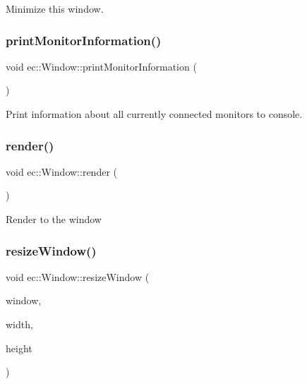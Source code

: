 Minimize this window. \mbox{\label{classec_1_1_window_aed6043c22655278bcb7d196b2a4ded82}} 
\subsubsection{\texorpdfstring{print\+Monitor\+Information()}{printMonitorInformation()}}
{\footnotesize\ttfamily void ec\+::\+Window\+::print\+Monitor\+Information (\begin{DoxyParamCaption}{ }\end{DoxyParamCaption})\hspace{0.3cm}{\ttfamily [static]}}

Print information about all currently connected monitors to console. \mbox{\label{classec_1_1_window_acb066b817adc7c790b0810695078dee3}} 
\subsubsection{\texorpdfstring{render()}{render()}}
{\footnotesize\ttfamily void ec\+::\+Window\+::render (\begin{DoxyParamCaption}{ }\end{DoxyParamCaption})\hspace{0.3cm}{\ttfamily [virtual]}}

Render to the window \mbox{\label{classec_1_1_window_a33ef071f4198715ae42844c681fb40eb}} 
\subsubsection{\texorpdfstring{resize\+Window()}{resizeWindow()}}
{\footnotesize\ttfamily void ec\+::\+Window\+::resize\+Window (\begin{DoxyParamCaption}\item[{G\+L\+F\+Wwindow $\ast$}]{window,  }\item[{int}]{width,  }\item[{int}]{height }\end{DoxyParamCaption})\hspace{0.3cm}{\ttfamily [virtual]}}

